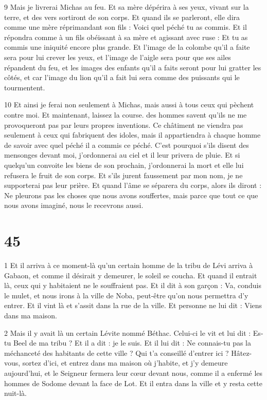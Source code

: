 \par 9 Mais je livrerai Michas au feu. Et sa mère dépérira à ses yeux, vivant sur la terre, et des vers sortiront de son corps. Et quand ils se parleront, elle dira comme une mère réprimandant son fils : Voici quel péché tu as commis. Et il répondra comme à un fils obéissant à sa mère et agissant avec ruse : Et tu as commis une iniquité encore plus grande. Et l'image de la colombe qu'il a faite sera pour lui crever les yeux, et l'image de l'aigle sera pour que ses ailes répandent du feu, et les images des enfants qu'il a faits seront pour lui gratter les côtés, et car l'image du lion qu'il a fait lui sera comme des puissants qui le tourmentent.

\par 10 Et ainsi je ferai non seulement à Michas, mais aussi à tous ceux qui pèchent contre moi. Et maintenant, laissez la course. des hommes savent qu’ils ne me provoqueront pas par leurs propres inventions. Ce châtiment ne viendra pas seulement à ceux qui fabriquent des idoles, mais il appartiendra à chaque homme de savoir avec quel péché il a commis ce péché. C'est pourquoi s'ils disent des mensonges devant moi, j'ordonnerai au ciel et il leur privera de pluie. Et si quelqu'un convoite les biens de son prochain, j'ordonnerai la mort et elle lui refusera le fruit de son corps. Et s’ils jurent faussement par mon nom, je ne supporterai pas leur prière. Et quand l'âme se séparera du corps, alors ils diront : Ne pleurons pas les choses que nous avons souffertes, mais parce que tout ce que nous avons imaginé, nous le recevrons aussi.

\chapter{45}

\par 1 Et il arriva à ce moment-là qu'un certain homme de la tribu de Lévi arriva à Gabaon, et comme il désirait y demeurer, le soleil se coucha. Et quand il entrait là, ceux qui y habitaient ne le souffraient pas. Et il dit à son garçon : Va, conduis le mulet, et nous irons à la ville de Noba, peut-être qu'on nous permettra d'y entrer. Et il vint là et s'assit dans la rue de la ville. Et personne ne lui dit : Viens dans ma maison.

\par 2 Mais il y avait là un certain Lévite nommé Béthac. Celui-ci le vit et lui dit : Es-tu Beel de ma tribu ? Et il a dit : je le suis. Et il lui dit : Ne connais-tu pas la méchanceté des habitants de cette ville ? Qui t'a conseillé d'entrer ici ? Hâtez-vous, sortez d'ici, et entrez dans ma maison où j'habite, et j'y demeure aujourd'hui, et le Seigneur fermera leur cœur devant nous, comme il a enfermé les hommes de Sodome devant la face de Lot. Et il entra dans la ville et y resta cette nuit-là.

